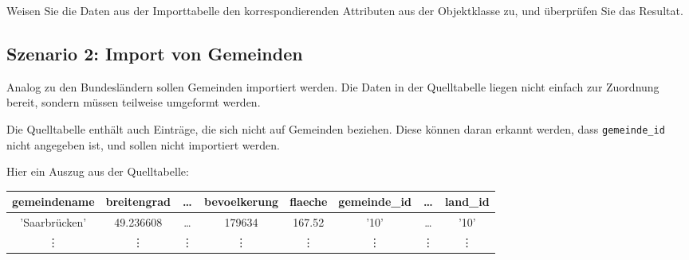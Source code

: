 \vspace{\baselineskip}\noindent
Weisen Sie die Daten aus der Importtabelle den korrespondierenden Attributen aus der Objektklasse zu, und überprüfen Sie das Resultat.

\clearpage

\subsection*{Szenario 2: Import von Gemeinden}

\vspace{\baselineskip}\noindent
Analog zu den Bundesländern sollen Gemeinden importiert werden. Die Daten in der Quelltabelle liegen nicht einfach zur Zuordnung bereit, sondern müssen teilweise umgeformt werden.

\noindent Die Quelltabelle enthält auch Einträge, die sich nicht auf Gemeinden beziehen. Diese
können daran erkannt werden, dass \texttt{gemeinde\_id} nicht angegeben ist, und sollen nicht importiert werden.

\vspace{\baselineskip}\noindent
Hier ein Auszug aus der Quelltabelle:
\begin{flushleft}
  \begin{tabular}{|| c | c | c | c | c | c | c | c ||}
    \hline
    gemeindename  & breitengrad & \dots  & bevoelkerung & flaeche & gemeinde\_id & \dots  & land\_id \\ [0.5ex]
    \hline\hline
    'Saarbrücken' & 49.236608   & \dots  & 179634       & 167.52  & '10'         & \dots  & '10'     \\
    \hline
    \vdots        & \vdots      & \vdots & \vdots       & \vdots  & \vdots       & \vdots & \vdots   \\
    \hline
  \end{tabular}
\end{flushleft}

